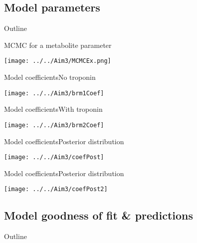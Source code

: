\documentclass[xcolor=dvipsnames]{beamer}
\begin{document}
\subsection{Model parameters}
\begin{frame}{Outline}
\vspace{-10.5pt}
\tableofcontents[currentsection,subsectionstyle=show/shaded/hide]
\end{frame}

\begin{frame}{MCMC for a metabolite parameter}
\vspace{-5pt}
\begin{center}
\texttt{[image: ../../Aim3/MCMCEx.png]}
\end{center}
\end{frame}


\begin{frame}{Model coefficients}{No troponin}
\vspace{-5pt}
\begin{center}
\texttt{[image: ../../Aim3/brm1Coef]}
\end{center}
\end{frame}

\begin{frame}{Model coefficients}{With troponin}
\vspace{-5pt}
\begin{center}
\texttt{[image: ../../Aim3/brm2Coef]}
\end{center}
\end{frame}

\begin{frame}{Model coefficients}{Posterior distribution}
\vspace{-5pt}
\begin{center}
\texttt{[image: ../../Aim3/coefPost]}
\end{center}
\end{frame}

\begin{frame}{Model coefficients}{Posterior distribution}
\vspace{-5pt}
\begin{center}
\texttt{[image: ../../Aim3/coefPost2]}
\end{center}
\end{frame}

\subsection{Model goodness of fit \& predictions}
\begin{frame}{Outline}
\vspace{-10.5pt}
\tableofcontents[currentsection,subsectionstyle=show/shaded/hide]
\end{frame}
\end{document}
